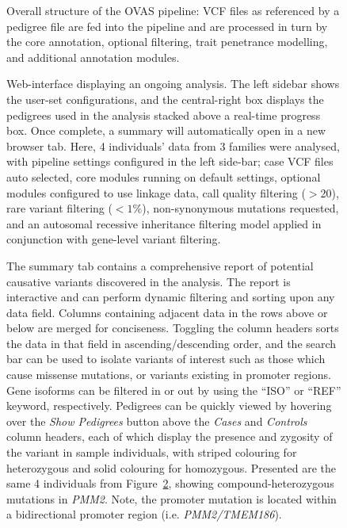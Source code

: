 \documentclass[twocolumn]{bmcart}%
\def\texttt{[image: ]}
\def\app{OVAS}
\begin{document}
\begin{backmatter}
%
\begin{figure}[h!]
  \caption{\csentence{}Overall structure of the \app{} pipeline: VCF files as referenced by a pedigree file are fed into the pipeline and are processed in turn by the core annotation, optional filtering, trait penetrance modelling, and additional annotation modules. \label{fig1}}
\end{figure}
\begin{figure}[h!]
\caption{\csentence{}Web-interface displaying an ongoing analysis. The left sidebar shows the user-set configurations, and the central-right box displays the pedigrees used in the analysis stacked above a real-time progress box. Once complete, a summary will automatically open in a new browser tab. Here, 4 individuals' data from 3 families were analysed, with pipeline settings configured in the left side-bar; case VCF files auto selected, core modules running on default settings, optional modules configured to use linkage data, call quality filtering ($>$20), rare variant filtering ($<1\%$), non-synonymous mutations requested, and an autosomal recessive inheritance filtering model applied in conjunction with gene-level variant filtering.
\label{fig2}}
\end{figure}
\begin{figure}[h!]
\caption{\csentence{}The summary tab contains a comprehensive report of potential causative variants discovered in the analysis. The report is interactive and can perform dynamic filtering and sorting upon any data field. Columns containing adjacent data in the rows above or below are merged for conciseness. Toggling the column headers sorts the data in that field in ascending/descending order, and the search bar can be used to isolate variants of interest such as those which cause missense mutations, or variants existing in promoter regions. Gene isoforms can be filtered in or out by using the ``ISO'' or ``REF'' keyword, respectively. Pedigrees can be quickly viewed by hovering over the \textit{Show Pedigrees} button above the \textit{Cases} and \textit{Controls} column headers, each of which display the presence and zygosity of the variant in sample individuals, with striped colouring for heterozygous and solid colouring for homozygous. Presented are the same 4 individuals from Figure~\ref{fig2}, showing compound-heterozygous mutations in \textit{PMM2}. Note, the promoter mutation is located within a bidirectional promoter region (i.e. \textit{PMM2/TMEM186}).
}
\end{figure}
\end{backmatter}
\end{document}
